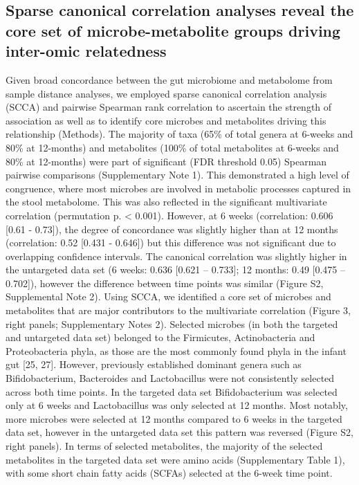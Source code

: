 \subsection{Sparse canonical correlation analyses reveal the core set of microbe-metabolite groups driving inter-omic relatedness}
Given broad concordance between the gut microbiome and metabolome from sample distance analyses, we employed sparse canonical correlation analysis (SCCA) and pairwise Spearman rank correlation to ascertain the strength of association as well as to identify core microbes and metabolites driving this relationship (Methods).   
The majority of taxa (65\% of total genera at 6-weeks and 80\% at 12-months) and metabolites (100\% of total metabolites at 6-weeks and 80\% at 12-months) were part of significant (FDR threshold 0.05) Spearman pairwise comparisons (Supplementary Note 1). This demonstrated a high level of congruence, where most microbes are involved in metabolic processes captured in the stool metabolome. This was also reflected in the significant multivariate correlation (permutation p. < 0.001). However, at 6 weeks (correlation: 0.606 [0.61 - 0.73]), the degree of concordance was slightly higher than at 12 months (correlation: 0.52 [0.431 - 0.646]) but this difference was not significant due to overlapping confidence intervals. The canonical correlation was slightly higher in the untargeted data set (6 weeks: 0.636 [0.621 – 0.733]; 12 months: 0.49 [0.475 – 0.702]), however the difference between time points was similar (Figure S2, Supplemental Note 2). 
Using SCCA, we identified a core set of microbes and metabolites that are major contributors to the multivariate correlation (Figure 3, right panels; Supplementary Notes 2). Selected microbes (in both the targeted and untargeted data set) belonged to the Firmicutes, Actinobacteria and Proteobacteria phyla, as those are the most commonly found phyla in the infant gut [25, 27]. However, previously established dominant genera such as Bifidobacterium, Bacteroides and Lactobacillus were not consistently selected across both time points. In the targeted data set Bifidobacterium was selected only at 6 weeks and Lactobacillus was only selected at 12 months. Most notably, more microbes were selected at 12 months compared to 6 weeks in the targeted data set, however in the untargeted data set this pattern was reversed (Figure S2, right panels). In terms of selected metabolites, the majority of the selected metabolites in the targeted data set were amino acids (Supplementary Table 1), with some short chain fatty acids (SCFAs) selected at the 6-week time point.  
